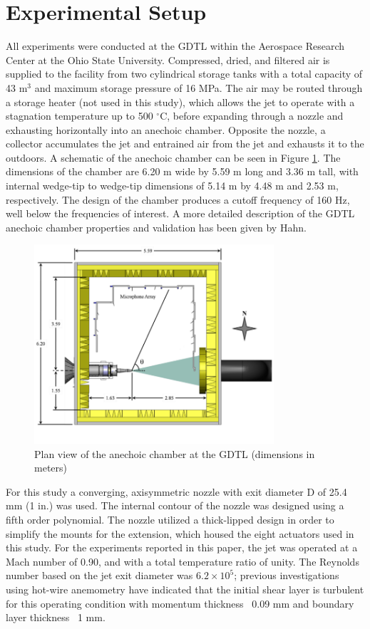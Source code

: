 \documentclass[english]{aiaa-tc}
\begin{document}
\section{Experimental Setup}
All experiments were conducted at the GDTL within the Aerospace Research Center at the Ohio State University. Compressed, dried, and filtered air is supplied to the facility from two cylindrical storage tanks with a total capacity of 43 m$^3$ and maximum storage pressure of 16 MPa. The air may be routed through a storage heater (not used in this study), which allows the jet to operate with a stagnation temperature up to 500 $^\circ$C, before expanding through a nozzle and exhausting horizontally into an anechoic chamber. Opposite the nozzle, a collector accumulates the jet and entrained air from the jet and exhausts it to the outdoors. A schematic of the anechoic chamber can be seen in Figure \ref{GDTLschematic}. The dimensions of the chamber are 6.20 m wide by 5.59 m long and 3.36 m tall, with internal wedge-tip to wedge-tip dimensions of 5.14 m by 4.48 m and 2.53 m, respectively. The design of the chamber produces a cutoff frequency of 160 Hz, well below the frequencies of interest. A more detailed description of the GDTL anechoic chamber properties and validation has been given by Hahn\cite{Hahn2011}.
\begin{figure}
\begin{center}
	\includegraphics[width=3.5in]{GDTL_facility_schematic}
    \caption{Plan view of the anechoic chamber at the GDTL (dimensions in meters)}\label{GDTLschematic}
\end{center}
\end{figure}

For this study a converging, axisymmetric nozzle with exit diameter D of 25.4 mm (1 in.) was used. The internal contour of the nozzle was designed using a fifth order polynomial. The nozzle utilized a thick-lipped design in order to simplify the mounts for the extension, which housed the eight actuators used in this study. For the experiments reported in this paper, the jet was operated at a Mach number of 0.90, and with a total temperature ratio of unity. The Reynolds number based on the jet exit diameter was $6.2 \times 10^5$; previous investigations using hot-wire anemometry have indicated that the initial shear layer is turbulent for this operating condition with momentum thickness ~0.09 mm and boundary layer thickness ~1 mm\cite{kfm2009-1}. 
\end{document}
